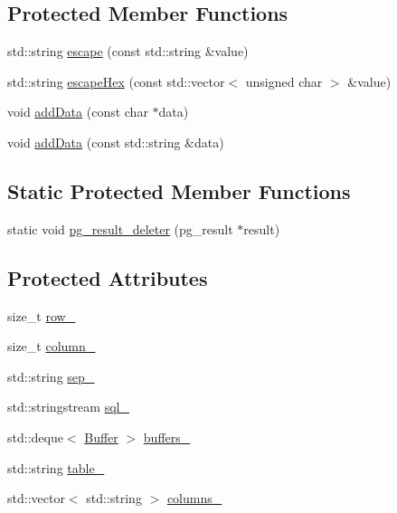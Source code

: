 \subsection*{Protected Member Functions}
\begin{DoxyCompactItemize}
\item 
std\+::string \hyperlink{classdbo_1_1stmt_1_1_bulk_statement_a0ee84702a51bab063d0cceb089fb9f6a}{escape} (const std\+::string \&value)
\item 
std\+::string \hyperlink{classdbo_1_1stmt_1_1_bulk_statement_a6e6c2a2e00233b6bd5e994e9167f56be}{escape\+Hex} (const std\+::vector$<$ unsigned char $>$ \&value)
\item 
void \hyperlink{classdbo_1_1stmt_1_1_bulk_statement_a4e6304fec07499aff629472d6c834972}{add\+Data} (const char $\ast$data)
\item 
void \hyperlink{classdbo_1_1stmt_1_1_bulk_statement_af4bdeffa23bff4f22081b5f0b839f54b}{add\+Data} (const std\+::string \&data)
\end{DoxyCompactItemize}
\subsection*{Static Protected Member Functions}
\begin{DoxyCompactItemize}
\item 
static void \hyperlink{classdbo_1_1stmt_1_1_bulk_statement_ad68e1cff54f7121031985db6bab98362}{pg\+\_\+result\+\_\+deleter} (pg\+\_\+result $\ast$result)
\end{DoxyCompactItemize}
\subsection*{Protected Attributes}
\begin{DoxyCompactItemize}
\item 
size\+\_\+t \hyperlink{classdbo_1_1stmt_1_1_bulk_statement_a354e1122b8e8e2a43769e84f8858023d}{row\+\_\+}
\item 
size\+\_\+t \hyperlink{classdbo_1_1stmt_1_1_bulk_statement_aa4fe97f33a962eb6fd063537881a6607}{column\+\_\+}
\item 
std\+::string \hyperlink{classdbo_1_1stmt_1_1_bulk_statement_a15af921e3b69e401e9cb2416094dac46}{sep\+\_\+}
\item 
std\+::stringstream \hyperlink{classdbo_1_1stmt_1_1_bulk_statement_ac32b572232a8d0378d420cf44bbca623}{sql\+\_\+}
\item 
std\+::deque$<$ \hyperlink{structdbo_1_1stmt_1_1_bulk_statement_1_1_buffer}{Buffer} $>$ \hyperlink{classdbo_1_1stmt_1_1_bulk_statement_a13929be97455dc9cd060c50bcae537cf}{buffers\+\_\+}
\item 
std\+::string \hyperlink{classdbo_1_1stmt_1_1_bulk_statement_af3e99f5a3fe342a6295c96927c66c1ed}{table\+\_\+}
\item 
std\+::vector$<$ std\+::string $>$ \hyperlink{classdbo_1_1stmt_1_1_bulk_statement_a6879423d29e1b68dbe1039aad61a33bd}{columns\+\_\+}
\end{DoxyCompactItemize}

